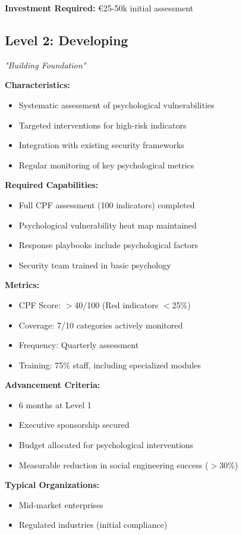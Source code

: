 \documentclass[11pt,a4paper]{article}
\begin{document}
\textbf{Investment Required:} €25-50k initial assessment

\subsection{Level 2: Developing}
\textit{"Building Foundation"}

\textbf{Characteristics:}
\begin{itemize}
\item Systematic assessment of psychological vulnerabilities
\item Targeted interventions for high-risk indicators
\item Integration with existing security frameworks
\item Regular monitoring of key psychological metrics
\end{itemize}

\textbf{Required Capabilities:}
\begin{itemize}
\item Full CPF assessment (100 indicators) completed
\item Psychological vulnerability heat map maintained
\item Response playbooks include psychological factors
\item Security team trained in basic psychology
\end{itemize}

\textbf{Metrics:}
\begin{itemize}
\item CPF Score: $>$40/100 (Red indicators $<$25\%)
\item Coverage: 7/10 categories actively monitored
\item Frequency: Quarterly assessment
\item Training: 75\% staff, including specialized modules
\end{itemize}

\textbf{Advancement Criteria:}
\begin{itemize}
\item 6 months at Level 1
\item Executive sponsorship secured
\item Budget allocated for psychological interventions
\item Measurable reduction in social engineering success ($>$30\%)
\end{itemize}

\textbf{Typical Organizations:}
\begin{itemize}
\item Mid-market enterprises
\item Regulated industries (initial compliance)
\end{itemize}
\end{document}
